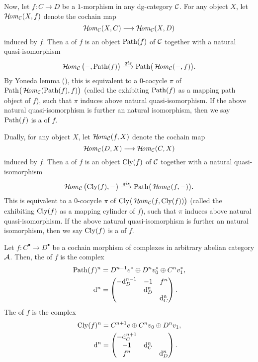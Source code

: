{Now, let $f\colon C\to D$ be a $1$-morphism in any dg-category ${\cal C}$. 
For any object $X$, let $\operatorname{\mathcal{H}\!\mathit{om}}_{{\cal C}}(X,f)$ denote 
the cochain map 
\[
\operatorname{\mathcal{H}\!\mathit{om}}_{{\cal C}}(X,C)\longrightarrow\operatorname{\mathcal{H}\!\mathit{om}}_{{\cal C}}(X,D)
\]
induced by $f$. 
Then a  of $f$ 
is an object $\mathrm{Path}(f)$ of ${\cal C}$ together with a natural quasi-isomorphism 
\[
\operatorname{\mathcal{H}\!\mathit{om}}_{{\cal C}}\big(-,\mathrm{Path}(f)\big)\stackrel{{qis}}{\longrightarrow} 
\mathrm{Path}\big(\operatorname{\mathcal{H}\!\mathit{om}}_{{\cal C}}(-,f)\big).
\]
By Yoneda lemma (), 
this is equivalent to a $0$-cocycle $\pi$ of 
$\mathrm{Path}\big(\operatorname{\mathcal{H}\!\mathit{om}}_{{\cal C}}(\mathrm{Path}(f),f)\big)$ 
(called the  
exhibiting $\mathrm{Path}(f)$ as a mapping path object of $f$),
such that $\pi$ induces above natural quasi-isomorphism. 
If the above natural quasi-isomorphism is further an 
natural isomorphism, then we say $\mathrm{Path}(f)$ is 
a  of $f$.

Dually, for any object $X$, let $\operatorname{\mathcal{H}\!\mathit{om}}_{{\cal C}}(f,X)$ denote 
the cochain map 
\[
\operatorname{\mathcal{H}\!\mathit{om}}_{{\cal C}}(D,X)\longrightarrow\operatorname{\mathcal{H}\!\mathit{om}}_{{\cal C}}(C,X)
\]
induced by $f$. 
Then a  of $f$ 
is an object $\mathrm{Cly}(f)$ of ${\cal C}$ together with 
a natural quasi-isomorphism 
\[
\operatorname{\mathcal{H}\!\mathit{om}}_{{\cal C}}\big(\mathrm{Cly}(f),-\big)\stackrel{{qis}}{\longrightarrow} 
\mathrm{Path}\big(\operatorname{\mathcal{H}\!\mathit{om}}_{{\cal C}}(f,-)\big).
\]
This is equivalent to a $0$-cocycle $\pi$ of 
$\mathrm{Cly}\big(\operatorname{\mathcal{H}\!\mathit{om}}_{{\cal C}}(f,\mathrm{Cly}(f))\big)$ 
(called the  
exhibiting $\mathrm{Cly}(f)$ as a mapping cylinder of $f$),
such that $\pi$ induces above natural quasi-isomorphism. 
If the above natural quasi-isomorphism is further an 
natural isomorphism, then we say $\mathrm{Cly}(f)$ is 
a  of $f$.

Let $f\colon C^{\bullet}\to D^{\bullet}$ 
be a cochain morphism of complexes in arbitrary 
abelian category ${\cal A}$. 
Then, the  of $f$ 
is the complex 
\begin{align*}
\mathrm{Path}(f)^n &= 
D^{n-1}e^{\ast}\oplus D^nv_0^{\ast}\oplus C^nv_1^{\ast}, \\
\mathrm{d}^n &= 
\begin{pmatrix}
-\mathrm{d}_D^{n-1} & -1 & f^n \\
 & \mathrm{d}_D^n & \\
 &  & \mathrm{d}_C^n
\end{pmatrix}.
\end{align*}
The  of $f$ 
is the complex 
\begin{align*}
\mathrm{Cly}(f)^n &= 
C^{n+1}e\oplus C^nv_0\oplus D^nv_1, \\
\mathrm{d}^n &= 
\begin{pmatrix}
-\mathrm{d}_C^{n+1} & & \\
-1 & \mathrm{d}_C^n & \\
f^n &  & \mathrm{d}_D^n
\end{pmatrix}.
\end{align*}

}
